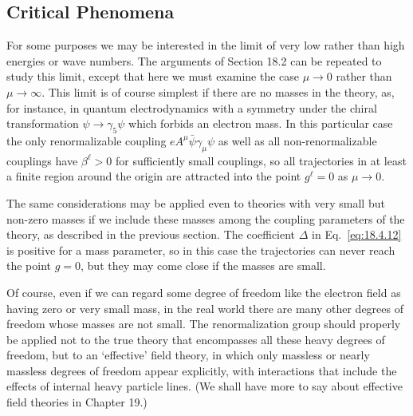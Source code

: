 
\subsection[Critical Phenomena]{Critical Phenomena\footnotemark}
\label{sec:18.5}

For some purposes we may be interested in the limit of very low rather than high energies or wave numbers. The arguments of Section 18.2 can be repeated to study this limit, except that here we must examine the case $\mu\to0$ rather than $\mu\to\infty$. This limit is of course simplest if there are no masses in the theory, as, for instance, in quantum electrodynamics with a symmetry under the chiral transformation $\psi\to\gamma_5\psi$ which forbids an electron mass. In this particular case the only renormalizable coupling $eA^\mu\bar\psi\gamma_\mu\psi$ as well as all non-renormalizable couplings have $\beta^\ell>0$ for sufficiently small couplings, so all trajectories in at least a finite region around the origin are attracted into the point $g^\ell=0$ as $\mu\to0$.

The same considerations may be applied even to theories with very small but non-zero masses if we include these masses among the coupling parameters of the theory, as described in the previous section. The coefficient $\Delta$ in Eq.~\eqref{eq:18.4.12} is positive for a mass parameter, so in this case the trajectories can never reach the point $g=0$, but they may come close if the masses are small.

Of course, even if we can regard some degree of freedom like the electron field as having zero or very small mass, in the real world there are many other degrees of freedom whose masses are not small. The renormalization group should properly be applied not to the true theory that encompasses all these heavy degrees of freedom, but to an `effective' field theory, in which only massless or nearly massless degrees of freedom appear explicitly, with interactions that include the effects of internal heavy particle lines. (We shall have more to say about effective field theories in Chapter 19.)


